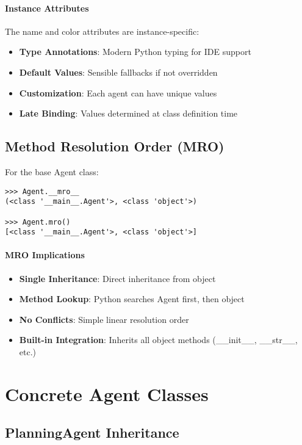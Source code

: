\paragraph{Instance Attributes}
The name and color attributes are instance-specific:
\begin{itemize}
\item \textbf{Type Annotations}: Modern Python typing for IDE support
\item \textbf{Default Values}: Sensible fallbacks if not overridden
\item \textbf{Customization}: Each agent can have unique values
\item \textbf{Late Binding}: Values determined at class definition time
\end{itemize}

\subsection{Method Resolution Order (MRO)}

For the base Agent class:
\begin{lstlisting}[caption=Agent MRO Analysis]
>>> Agent.__mro__
(<class '__main__.Agent'>, <class 'object'>)

>>> Agent.mro()
[<class '__main__.Agent'>, <class 'object'>]
\end{lstlisting}

\paragraph{MRO Implications}
\begin{itemize}
\item \textbf{Single Inheritance}: Direct inheritance from object
\item \textbf{Method Lookup}: Python searches Agent first, then object
\item \textbf{No Conflicts}: Simple linear resolution order
\item \textbf{Built-in Integration}: Inherits all object methods (\_\_init\_\_, \_\_str\_\_, etc.)
\end{itemize}

\section{Concrete Agent Classes}

\subsection{PlanningAgent Inheritance}

